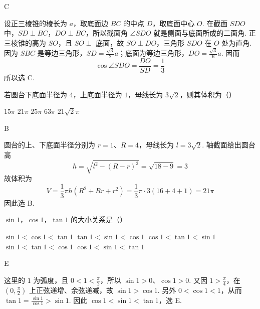 \documentclass[UTF8,a4paper,oneside,11pt]{ctexbook}
\begin{document}
\begin{answer}
C
\end{answer}

\begin{solution}
设正三棱锥的棱长为 \(a\)，取底面边 \(BC\) 的中点 \(D\)，取底面中心 \(O\). 在截面 \(SDO\) 中，\(SD\perp BC\)，\(DO\perp BC\)，所以截面角 \(\angle SDO\) 就是侧面与底面所成的二面角. 正三棱锥的高为 \(SO\)，且 \(SO\perp\) 底面，故 \(SO\perp DO\)，三角形 \(SDO\) 在 \(O\) 处为直角. 因为 \(SBC\) 是等边三角形，\(SD=\frac{\sqrt{3}}{2}a\)；底面为等边三角形，\(DO=\frac{\sqrt{3}}{6}a\). 因而
\[
\cos\angle SDO=\frac{DO}{SD}=\frac{1}{3}
\]
所以选 C.
\end{solution}


\begin{problem}

若圆台下底面半径为 \(4\)，上底面半径为 \(1\)，母线长为 \(3\sqrt{2}\)，则其体积为（\quad）

\choicesfive
    {\(15\pi\)}
    {\(21\pi\)}
    {\(25\pi\)}
    {\(63\pi\)}
    {\(21\sqrt{2}\pi\)}
\end{problem}

\begin{answer}
B
\end{answer}

\begin{solution}
圆台的上、下底面半径分别为 \(r=1\)、\(R=4\)，母线长为 \(l=3\sqrt{2}\). 轴截面给出圆台高
\[
h=\sqrt{l^2-(R-r)^2}=\sqrt{18-9}=3
\]
故体积为
\[
V=\frac{1}{3}\pi h(R^2+Rr+r^2)=\frac{1}{3}\pi\cdot3(16+4+1)=21\pi
\]
因此选 B.
\end{solution}


\begin{problem}

\(\sin 1\)，\(\cos 1\)，\(\tan 1\) 的大小关系是（\quad）

\choicesfive
    {\(\sin1<\cos1<\tan1\)}
    {\(\tan1<\sin1<\cos1\)}
    {\(\cos1<\tan1<\sin1\)}
    {\(\sin1<\tan1<\cos1\)}
    {\(\cos1<\sin1<\tan1\)}
\end{problem}

\begin{answer}
E
\end{answer}

\begin{solution}
这里的 \(1\) 为弧度，且 \(0<1<\frac{\pi}{2}\)，所以 \(\sin1>0\)、\(\cos1>0\). 又因 \(1>\frac{\pi}{4}\)，在 \((0,\frac{\pi}{2})\) 上正弦递增、余弦递减，故 \(\sin1>\cos1\). 另外 \(0<\cos1<1\)，从而 \(\tan1=\frac{\sin1}{\cos1}>\sin1\). 因此 \(\cos1<\sin1<\tan1\)，选 E.
\end{solution}
\end{document}
